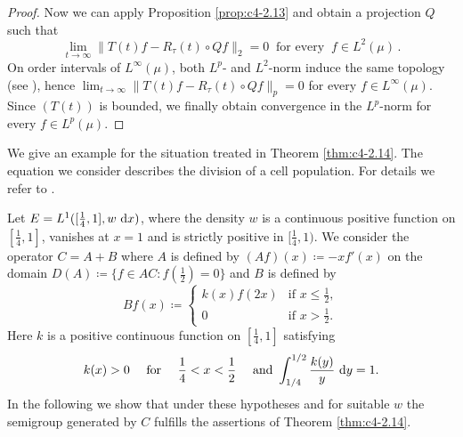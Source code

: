 \begin{proof}
Now we can apply Proposition \ref{prop:c4-2.13} and obtain a projection $Q$ such that 
\[ 
\lim_{t \to \infty}\|T(t)f - R_{\tau}(t) \circ Qf\|_{2} = 0 \ \text{ for every 
} \ f \in L^{2}(\mu)\,.
\]
On order intervals of $L^{\infty}(\mu)$, both $L^{p}$- and $L^{2}$-norm induce the same topology (see \citet[V.8.3]{schaefer:1974}), 
hence $\lim_{t \to \infty} \|T(t)f - R_{\tau}(t) \circ Qf\|_{p} = 0$ for every $f \in L^{\infty}(\mu)$.
Since $(T(t))$ is bounded, we finally obtain convergence in the $L^{p}$-norm for every $f \in L^{p}(\mu)$.
\end{proof}
We give an example for the situation treated in Theorem \ref{thm:c4-2.14}.
The equation we consider describes the division of a cell population.
For details we refer to \citet{diekmannetal:1984}.

\begin{example}\label{ex:c4-2.15}
%
%
%
Let $E = L^{1}([\frac{1}{4},1],w\,\mathop{}\!\mathrm{d}{x})$, where the density $w$ is a continuous positive function on $[\frac{1}{4},1]$, vanishes at $x = 1$ and is strictly positive in $[\frac{1}{4},1)$.
We consider the operator $C = A + B$ where $A$ is defined by $(Af)(x) \coloneq  -xf'(x)$ on the domain $D(A) \coloneqq \{f \in AC \colon f(\frac{1}{2}) = 0\}$ and $B$ is defined by
\begin{equation*}\label{eq:c4-2.12-kgk}
Bf(x) \coloneqq \begin{cases}
    k(x)f(2x) & \text{if } x \leq \frac{1}{2}, \\
    0 & \text{if } x > \frac{1}{2}.
\end{cases}
\end{equation*}
Here $k$ is a positive continuous function on $[\frac{1}{4},1]$ satisfying
\begin{equation}\label{eq:c4-2.13}
k(x) > 0 \quad \text{ for } \quad \frac{1}{4} < x < \frac{1}{2} \quad \text{ and }  \int_{1/4}^{1/2} \frac{k(y)}{y} \, \mathop{}\!\mathrm{d}{y} = 1.
\end{equation}
In the following we show that under these hypotheses and for suitable $w$ the semigroup generated by $C$ fulfills the assertions of Theorem \ref{thm:c4-2.14}.


\end{example}
